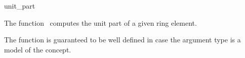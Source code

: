 \begin{ccRefFunction}{unit_part}

\ccDefinition

The function \ccRefName\ computes the unit part of a given ring 
element. 

The function is guaranteed to be well defined in case the argument type 
is a model of the  concept. 


{}


\ccSeeAlso

\\
\\

\end{ccRefFunction}
